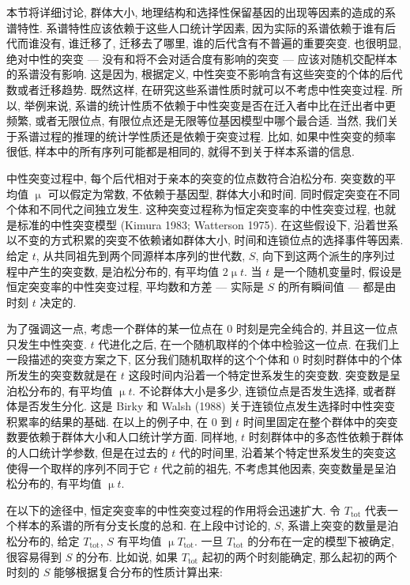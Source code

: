 \documentclass[12pt]{article}
\begin{document}
本节将详细讨论, 群体大小, 地理结构和选择性保留基因的出现等因素的造成的系谱特性. 系谱特性应该依赖于这些人口统计学因素,
因为实际的系谱依赖于谁有后代而谁没有, 谁迁移了, 迁移去了哪里, 谁的后代含有不普遍的重要突变. 也很明显, 绝对中性的突变 ---
没有和将不会对适合度有影响的突变 --- 应该对随机交配样本的系谱没有影响. 这是因为, 根据定义,
中性突变不影响含有这些突变的个体的后代数或者迁移趋势. 既然这样, 在研究这些系谱性质时就可以不考虑中性突变过程.
所以, 举例来说, 系谱的统计性质不依赖于中性突变是否在迁入者中比在迁出者中更频繁, 或者无限位点,
有限位点还是无限等位基因模型中哪个最合适. 当然, 我们关于系谱过程的推理的统计学性质还是依赖于突变过程. 比如,
如果中性突变的频率很低, 样本中的所有序列可能都是相同的, 就得不到关于样本系谱的信息.

中性突变过程中, 每个后代相对于亲本的突变的位点数符合泊松分布. 突变数的平均值 $\upmu$ 可以假定为常数, 不依赖于基因型,
群体大小和时间. 同时假定突变在不同个体和不同代之间独立发生. 这种突变过程称为恒定突变率的中性突变过程,
也就是标准的中性突变模型 (Kimura 1983; Watterson 1975). 在这些假设下,
沿着世系以不变的方式积累的突变不依赖诸如群体大小, 时间和连锁位点的选择事件等因素. 给定 $t$,
从共同祖先到两个同源样本序列的世代数, $S$, 向下到这两个派生的序列过程中产生的突变数, 是泊松分布的, 有平均值 $2 \upmu
t$. 当 $t$ 是一个随机变量时, 假设是恒定突变率的中性突变过程, 平均数和方差 --- 实际是 $S$ 的所有瞬间值 --- 都是由时刻
$t$ 决定的.

为了强调这一点, 考虑一个群体的某一位点在 0 时刻是完全纯合的, 并且这一位点只发生中性突变. $t$ 代进化之后,
在一个随机取样的个体中检验这一位点. 在我们上一段描述的突变方案之下, 区分我们随机取样的这个个体和 0
时刻时群体中的个体所发生的突变数就是在 $t$ 这段时间内沿着一个特定世系发生的突变数. 突变数是呈泊松分布的, 有平均值 $\upmu
t$. 不论群体大小是多少, 连锁位点是否发生选择, 或者群体是否发生分化. 这是 Birky 和 Walsh (1988)
关于连锁位点发生选择时中性突变积累率的结果的基础. 在以上的例子中, 在 0 到 $t$
时间里固定在整个群体中的突变数要依赖于群体大小和人口统计学方面. 同样地, $t$
时刻群体中的多态性依赖于群体的人口统计学参数, 但是在过去的 $t$ 代的时间里,
沿着某个特定世系发生的突变这使得一个取样的序列不同于它 $t$ 代之前的祖先, 不考虑其他因素, 突变数量是呈泊松分布的, 有平均值
$\upmu t$.

在以下的途径中, 恒定突变率的中性突变过程的作用将会迅速扩大. 令 $T_{\text{tot}}$ 代表一个样本的系谱的所有分支长度的总和.
在上段中讨论的, $S$, 系谱上突变的数量是泊松分布的, 给定 $T_{\text{tot}}$, $S$ 有平均值 $\upmu T_{\text{tot}}$.
一旦 $T_{\text{tot}}$ 的分布在一定的模型下被确定, 很容易得到 $S$ 的分布. 比如说, 如果 $T_{\text{tot}}$
起初的两个时刻能确定, 那么起初的两个时刻的 $S$ 能够根据复合分布的性质计算出来:
\end{document}
